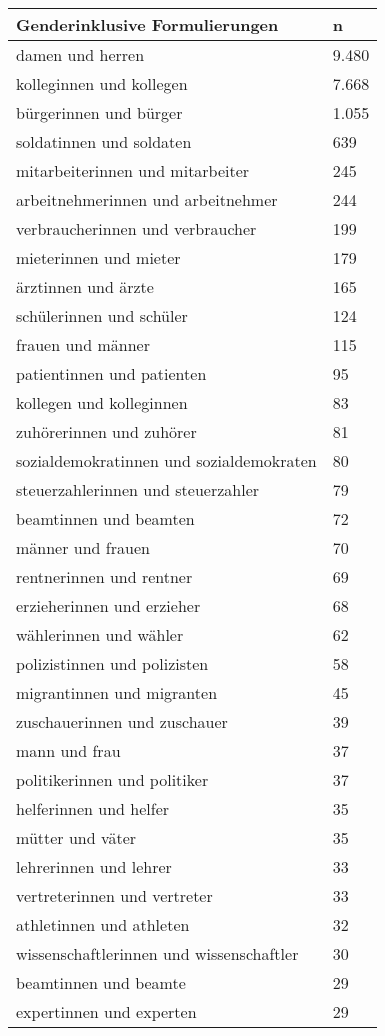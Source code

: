 
\begin{tabular}{ll}
\toprule
Genderinklusive Formulierungen & n\\
\midrule
damen und herren & 9.480\\
kolleginnen und kollegen & 7.668\\
bürgerinnen und bürger & 1.055\\
soldatinnen und soldaten & 639\\
mitarbeiterinnen und mitarbeiter & 245\\
arbeitnehmerinnen und arbeitnehmer & 244\\
verbraucherinnen und verbraucher & 199\\
mieterinnen und mieter & 179\\
ärztinnen und ärzte & 165\\
schülerinnen und schüler & 124\\
frauen und männer & 115\\
patientinnen und patienten & 95\\
kollegen und kolleginnen & 83\\
zuhörerinnen und zuhörer & 81\\
sozialdemokratinnen und sozialdemokraten & 80\\
steuerzahlerinnen und steuerzahler & 79\\
beamtinnen und beamten & 72\\
männer und frauen & 70\\
rentnerinnen und rentner & 69\\
erzieherinnen und erzieher & 68\\
wählerinnen und wähler & 62\\
polizistinnen und polizisten & 58\\
migrantinnen und migranten & 45\\
zuschauerinnen und zuschauer & 39\\
mann und frau & 37\\
politikerinnen und politiker & 37\\
helferinnen und helfer & 35\\
mütter und väter & 35\\
lehrerinnen und lehrer & 33\\
vertreterinnen und vertreter & 33\\
athletinnen und athleten & 32\\
wissenschaftlerinnen und wissenschaftler & 30\\
beamtinnen und beamte & 29\\
expertinnen und experten & 29\\

\end{tabular}
